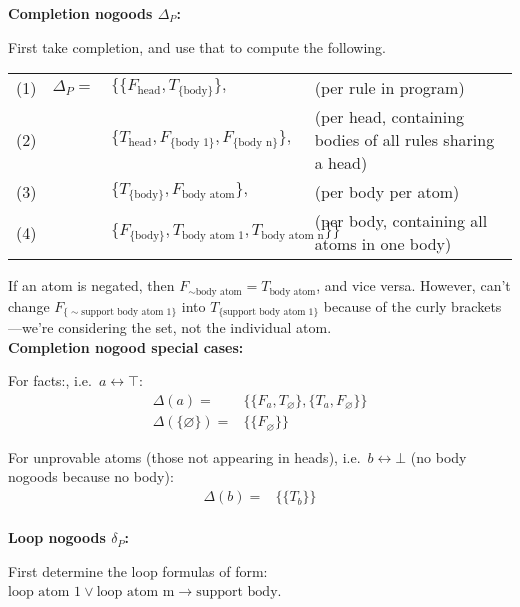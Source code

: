 \documentclass[9pt,a4paper,landscape]{article}
\newcommand{\ngtb}[1]{T_{ \{#1\} }}
\newcommand{\ngfb}[1]{F_{ \{#1\} }}
\newcommand{\ngta}[1]{T_{#1}}
\newcommand{\ngfa}[1]{F_{#1}}
\begin{document}
{\vspace{\baselineskip}
\textbf{Completion nogoods $\Delta_P$:}

First take completion, and use that to compute the following.

\begin{center}
	\begin{tabular}{lrll}
	(1) & $\Delta_P =$ 	& $\{ \{ \ngfa{\text{head}}, \ngtb{\text{body}} \},$ & (per rule in program) \\
	(2) &				& $\{ \ngta{\text{head}}, \ngfb{\text{body 1}}, \ngfb{\text{body n}} \},$ & (per head, containing bodies of all rules sharing a head) \\
	(3) &				& $\{ \ngtb{\text{body}}, \ngfa{\text{body atom}} \},$ & (per body per atom)\\
	(4) &				& $\{ \ngfb{\text{body}}, \ngta{\text{body atom 1}}, \ngta{\text{body atom n}} \} \}$ & (per body, containing all atoms in one body)
\end{tabular}
\end{center}

If an atom is negated, then $\ngfa{{\sim} \text{body atom}} = \ngta{\text{body atom}}$, and vice versa.
However, can't change $\ngfb{{\sim} \text{support body atom 1}}$ into $\ngtb{\text{support body atom 1}}$ because of the curly brackets---we're considering the set, not the individual atom.\\

\vspace{\baselineskip}
\textbf{Completion nogood special cases:}

For facts:, i.e.\ $a \leftrightarrow \top$:
\begin{align*}
\Delta (a) = & \{ \{ \ngfa{a}, \ngta{\varnothing} \}, \{ \ngta{a}, \ngfa{\varnothing} \} \} \\
\Delta (\{\varnothing\}) = & \{ \{ \ngfa{\varnothing} \} \}
\end{align*}

For unprovable atoms (those not appearing in heads), i.e.\ $b \leftrightarrow \bot$ (no body nogoods because no body):
\begin{align*}
\Delta (b) = & \{ \{ \ngta{b} \} \} \\
\end{align*}

\vspace{\baselineskip}
\textbf{Loop nogoods $\delta_P$:}
 
First determine the loop formulas of form: $\text{loop atom 1} \lor \text{loop atom m} \rightarrow \text{support body}$.

}
\end{document}
